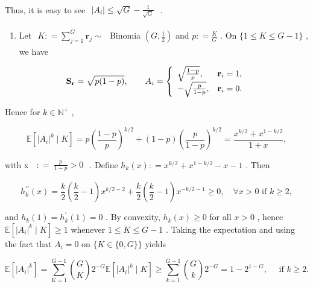 \documentclass[
  10
]{article}
\providecommand{\tightlist}{%
  \setlength{\itemsep}{0pt}\setlength{\parskip}{0pt}}
\begin{document}
Thus, it is easy to see
\(\begin{array} { r } { | A _ { i } | \le \sqrt { G } - \frac { 1 } { \sqrt { G } } } \end{array}\)
.

\begin{enumerate}
\def\labelenumi{(\roman{enumi})}
\setcounter{enumi}{2}
\tightlist
\item
  Let
  \(\begin{array} { r } { K : = \sum _ { j = 1 } ^ { G } \mathbf { r } _ { j } \sim } \end{array}\)
  Binomia \(( G , { \frac { 1 } { 2 } } )\) and
  \(\textstyle p : = { \frac { K } { G } }\) . On
  \(\{ 1 \leq K \leq G - 1 \}\) , we have
\end{enumerate}

\[
\mathbf {S} _ {\mathbf {r}} = \sqrt {p (1 - p)}, \qquad A _ {i} = \left\{ \begin{array}{l l} \sqrt {\frac {1 - p}{p}}, & \mathbf {r} _ {i} = 1, \\ - \sqrt {\frac {p}{1 - p}}, & \mathbf {r} _ {i} = 0. \end{array} \right.
\]

Hence for \(k \in \mathbb { N } ^ { + }\) ,

\[
\mathbb {E} [ | A _ {i} | ^ {k} \mid K ] = p \left(\frac {1 - p}{p}\right) ^ {k / 2} + (1 - p) \left(\frac {p}{1 - p}\right) ^ {k / 2} = \frac {x ^ {k / 2} + x ^ {1 - k / 2}}{1 + x},
\]

with x
\(\begin{array} { r } { \mathrm { ~ : = ~ } \frac { p } { 1 - p } > 0 } \end{array}\)
. Define
\(h _ { k } ( x ) : = x ^ { k / 2 } + x ^ { 1 - k / 2 } - x - 1\) . Then

\[
h _ {k} ^ {\prime \prime} (x) = \frac {k}{2} \left(\frac {k}{2} - 1\right) x ^ {k / 2 - 2} + \frac {k}{2} \left(\frac {k}{2} - 1\right) x ^ {- k / 2 - 1} \geq 0, \quad \forall x > 0 \text {   if   } k \geq 2,
\]

and \(h _ { k } ( 1 ) = h _ { k } ^ { \prime } ( 1 ) = 0\) . By
convexity, \(h _ { k } ( x ) \geq 0\) for all \(x > 0\) , hence
\(\mathbb { E } [ | A _ { i } | ^ { k } \mid K ] \geq 1\) whenever
\(1 \leq \ddot { K } \leq G - 1\) . Taking the expectation and using the
fact that \(A _ { i } = 0\) on \(\{ K \in \{ 0 , G \} \}\) yields

\[
\mathbb {E} [ | A _ {i} | ^ {k} ] = \sum_ {K = 1} ^ {G - 1} \binom {G} {K} 2 ^ {- G} \mathbb {E} [ | A _ {i} | ^ {k} \mid K ] \geq \sum_ {k = 1} ^ {G - 1} \binom {G} {k} 2 ^ {- G} = 1 - 2 ^ {1 - G}, \quad \text { if } k \geq 2.
\]
\end{document}
